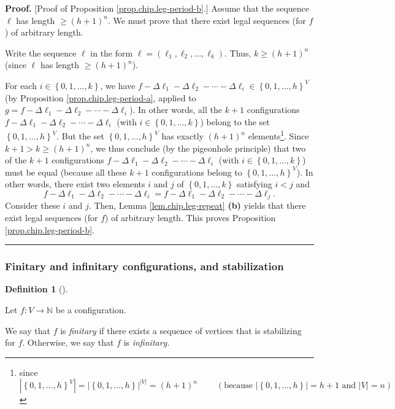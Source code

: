 \documentclass[numbers=enddot,12pt,final,onecolumn,notitlepage]{scrartcl}%
\theoremstyle{definition}
\newtheorem{defi}[theo]{Definition}
\newenvironment{definition}[1][]
{\begin{defi}[#1]\begin{leftbar}}
{\end{leftbar}\end{defi}}
\newenvironment{proof}[1][Proof]{\noindent\textbf{#1.} }{\ \rule{0.5em}{0.5em}}
\newcommand{\NN}{\mathbb{N}}
\newcommand{\tup}[1]{\left( #1 \right)}
\begin{document}
\begin{proof}
[Proof of Proposition \ref{prop.chip.leg-period-b}.] Assume that the sequence
$\ell$ has length $\geq\left(  h+1\right)  ^{n}$. We must prove that there
exist legal sequences (for $f$) of arbitrary length.

Write the sequence $\ell$ in the form
$\ell = \tup{\ell_1, \ell_2, \ldots, \ell_k}$.
Thus, $k\geq\left(  h+1\right)  ^{n}$ (since
$\ell$ has length $\geq\left(  h+1\right)  ^{n}$).

For each $i\in\left\{  0,1,\ldots,k\right\}  $, we have $f-\Delta\ell
_{1}-\Delta\ell_{2}-\cdots-\Delta\ell_{i}\in\left\{  0,1,\ldots,h\right\}
^{V}$ (by Proposition \ref{prop.chip.leg-period-a}, applied to $g=f-\Delta
\ell_{1}-\Delta\ell_{2}-\cdots-\Delta\ell_{i}$). In other words, all the $k+1$
configurations $f-\Delta\ell_{1}-\Delta\ell_{2}-\cdots-\Delta\ell_{i}$ (with
$i\in\left\{  0,1,\ldots,k\right\}  $) belong to the set $\left\{
0,1,\ldots,h\right\}  ^{V}$. But the set $\left\{  0,1,\ldots,h\right\}  ^{V}$
has exactly $\left(  h+1\right)  ^{n}$ elements\footnote{since%
\[
\left\vert \left\{  0,1,\ldots,h\right\}  ^{V}\right\vert =\left\vert \left\{
0,1,\ldots,h\right\}  \right\vert ^{\left\vert V\right\vert }=\left(
h+1\right)  ^{n}\ \ \ \ \ \ \ \ \ \ \left(  \text{because }\left\vert \left\{
0,1,\ldots,h\right\}  \right\vert =h+1\text{ and }\left\vert V\right\vert
=n\right)
\]
}. Since $k+1>k\geq\left(  h+1\right)  ^{n}$, we thus conclude (by the
pigeonhole principle) that two of the $k+1$ configurations $f-\Delta\ell
_{1}-\Delta\ell_{2}-\cdots-\Delta\ell_{i}$ (with $i\in\left\{  0,1,\ldots
,k\right\}  $) must be equal (because all these $k+1$ configurations belong to
$\left\{  0,1,\ldots,h\right\}  ^{V}$). In other words, there exist two
elements $i$ and $j$ of $\left\{  0,1,\ldots,k\right\}  $ satisfying $i<j$ and%
\[
f-\Delta\ell_{1}-\Delta\ell_{2}-\cdots-\Delta\ell_{i}=f-\Delta\ell_{1}%
-\Delta\ell_{2}-\cdots-\Delta\ell_{j}.
\]
Consider these $i$ and $j$. Then, Lemma \ref{lem.chip.leg-repeat} \textbf{(b)}
yields that there exist legal sequences (for $f$) of arbitrary length. This
proves Proposition \ref{prop.chip.leg-period-b}.
\end{proof}

\subsubsection{Finitary and infinitary configurations, and stabilization}

\begin{definition}
Let $f : V \to \NN$ be a configuration.

We say that $f$ is \textit{finitary} if there
exists a sequence of vertices that is stabilizing for $f$.
Otherwise, we say that $f$ is \textit{infinitary}.
\end{definition}
\end{document}
